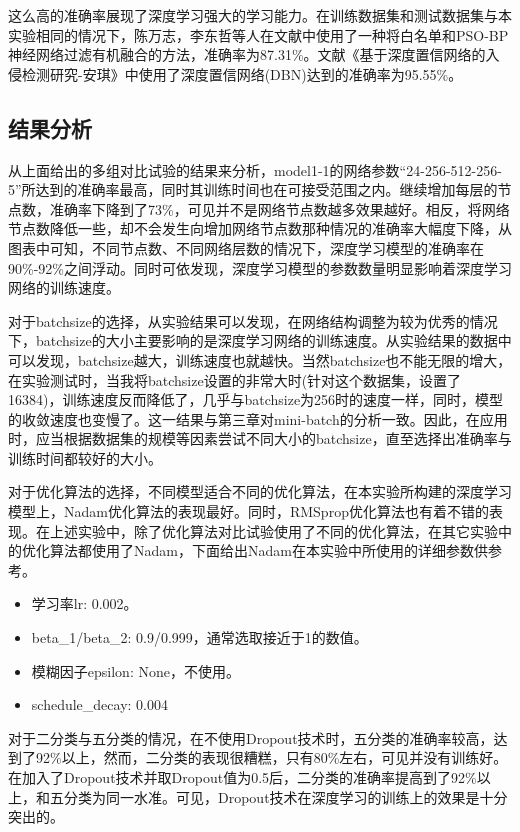 这么高的准确率展现了深度学习强大的学习能力。在训练数据集和测试数据集与本实验相同的情况下，陈万志，李东哲等人在文献\cite{r10}中使用了一种将白名单和PSO-BP神经网络过滤有机融合的方法，准确率为87.31\%。文献《基于深度置信网络的入侵检测研究-安琪》中使用了深度置信网络(DBN)达到的准确率为95.55\%\cite{r9}。
  
\subsection{结果分析}

从上面给出的多组对比试验的结果来分析，model1-1的网络参数“24-256-512-256-5”所达到的准确率最高，同时其训练时间也在可接受范围之内。继续增加每层的节点数，准确率下降到了73\%，可见并不是网络节点数越多效果越好。相反，将网络节点数降低一些，却不会发生向增加网络节点数那种情况的准确率大幅度下降，从图表中可知，不同节点数、不同网络层数的情况下，深度学习模型的准确率在90\%-92\%之间浮动。同时可依发现，深度学习模型的参数数量明显影响着深度学习网络的训练速度。

对于batchsize的选择，从实验结果可以发现，在网络结构调整为较为优秀的情况下，batchsize的大小主要影响的是深度学习网络的训练速度。从实验结果的数据中可以发现，batchsize越大，训练速度也就越快。当然batchsize也不能无限的增大，在实验测试时，当我将batchsize设置的非常大时(针对这个数据集，设置了16384)，训练速度反而降低了，几乎与batchsize为256时的速度一样，同时，模型的收敛速度也变慢了。这一结果与第三章对mini-batch的分析一致。因此，在应用时，应当根据数据集的规模等因素尝试不同大小的batchsize，直至选择出准确率与训练时间都较好的大小。

对于优化算法的选择，不同模型适合不同的优化算法，在本实验所构建的深度学习模型上，Nadam优化算法的表现最好。同时，RMSprop优化算法也有着不错的表现。在上述实验中，除了优化算法对比试验使用了不同的优化算法，在其它实验中的优化算法都使用了Nadam，下面给出Nadam在本实验中所使用的详细参数供参考。
\begin{itemize}
	\item 学习率lr: 0.002。
	\item beta\_1/beta\_2: 0.9/0.999，通常选取接近于1的数值。
	\item 模糊因子epsilon: None，不使用。
	\item schedule\_decay: 0.004
\end{itemize}

对于二分类与五分类的情况，在不使用Dropout技术时，五分类的准确率较高，达到了92\%以上，然而，二分类的表现很糟糕，只有80\%左右，可见并没有训练好。在加入了Dropout技术并取Dropout值为0.5后，二分类的准确率提高到了92\%以上，和五分类为同一水准。可见，Dropout技术在深度学习的训练上的效果是十分突出的。

